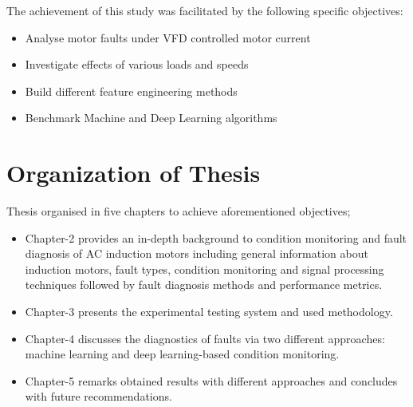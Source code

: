 The achievement of this study was facilitated by the following specific objectives:
\begin{itemize}
\item Analyse motor faults under VFD controlled motor current
\item Investigate effects of various loads and speeds
\item Build different feature engineering methods 
\item Benchmark Machine and Deep Learning algorithms 
\end{itemize}

\section{Organization of Thesis}
\label{organization}

Thesis organised in five chapters to achieve aforementioned objectives;
\begin{itemize}
\item Chapter-2 provides an in-depth background to condition monitoring and fault diagnosis of AC induction motors including general information about induction motors, fault types, condition monitoring and signal processing techniques followed by fault diagnosis methods and performance metrics.

\item Chapter-3 presents the experimental testing system and used methodology.

\item Chapter-4 discusses the diagnostics of faults via two different approaches: machine learning and deep learning-based condition monitoring.

\item Chapter-5 remarks obtained results with different approaches and concludes with future recommendations.

\end{itemize}